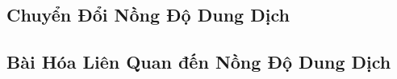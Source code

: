 \documentclass{article}
\numberwithin{equation}{section}
\begin{document}

\subsection{Chuyển Đổi Nồng Độ Dung Dịch}


\subsection{Bài Hóa Liên Quan đến Nồng Độ Dung Dịch}


\printbibliography[heading=bibintoc]
	
\end{document}
